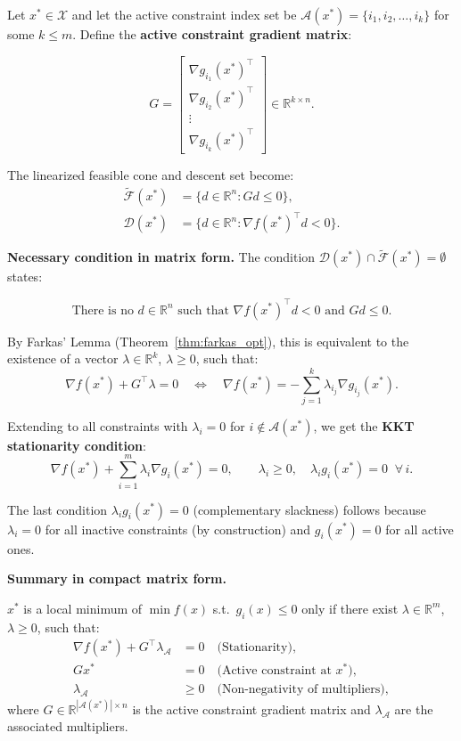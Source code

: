 \documentclass[11pt]{article}
\theoremstyle{definition}
\theoremstyle{plain}
\theoremstyle{remark}
\begin{document}
Let $x^* \in \mathcal{X}$ and let the active constraint index set be $\mathcal{A}(x^*) = \{i_1, i_2, \ldots, i_k\}$ for some $k \leq m$. Define the \textbf{active constraint gradient matrix}:

\[
  G =
  \begin{bmatrix}
    \nabla g_{i_1}(x^*)^\top \\
    \nabla g_{i_2}(x^*)^\top \\
    \vdots \\
    \nabla g_{i_k}(x^*)^\top
  \end{bmatrix} \in \mathbb{R}^{k \times n}.
\]

The linearized feasible cone and descent set become:
\begin{align*}
  \widetilde{\mathcal{F}}(x^*) &= \{d \in \mathbb{R}^n : Gd \leq 0\}, \\
  \mathcal{D}(x^*)             &= \{d \in \mathbb{R}^n : \nabla f(x^*)^\top d < 0\}.
\end{align*}

\textbf{Necessary condition in matrix form.} The condition $\mathcal{D}(x^*) \cap \widetilde{\mathcal{F}}(x^*) = \emptyset$ states:

\[
  \boxed{\text{There is no } d \in \mathbb{R}^n \text{ such that } \nabla f(x^*)^\top d < 0 \text{ and } Gd \leq 0.}
\]

By Farkas' Lemma (Theorem~\ref{thm:farkas_opt}), this is equivalent to the existence of a vector $\lambda \in \mathbb{R}^k$, $\lambda \geq 0$, such that:
\[
  \nabla f(x^*) + G^\top \lambda = 0 \quad \Longleftrightarrow \quad \nabla f(x^*) = -\sum_{j=1}^{k} \lambda_{i_j} \nabla g_{i_j}(x^*).
\]

Extending to all constraints with $\lambda_i = 0$ for $i \notin \mathcal{A}(x^*)$, we get the \textbf{KKT stationarity condition}:
\[
  \nabla f(x^*) + \sum_{i=1}^{m} \lambda_i \nabla g_i(x^*) = 0, \qquad \lambda_i \geq 0, \quad \lambda_i g_i(x^*) = 0 \;\; \forall\, i.
\]

The last condition $\lambda_i g_i(x^*) = 0$ (complementary slackness) follows because $\lambda_i = 0$ for all inactive constraints (by construction) and $g_i(x^*) = 0$ for all active ones.

\textbf{Summary in compact matrix form.}

\begin{tcolorbox}[colback=blue!5, colframe=blue!60!black, title=Local Minimum Characterization (Matrix Form)]
$x^*$ is a local minimum of $\min f(x)$ s.t.\ $g_i(x) \leq 0$ only if there exist $\lambda \in \mathbb{R}^m$, $\lambda \geq 0$, such that:
\begin{align*}
  \nabla f(x^*) + G^\top \lambda_{\mathcal{A}} &= 0 \quad \text{(Stationarity)}, \\
  G x^* &= 0 \quad \text{(Active constraint at } x^*\text{)}, \\
  \lambda_{\mathcal{A}} &\geq 0 \quad \text{(Non-negativity of multipliers)},
\end{align*}
where $G \in \mathbb{R}^{|\mathcal{A}(x^*)| \times n}$ is the active constraint gradient matrix and $\lambda_{\mathcal{A}}$ are the associated multipliers.
\end{tcolorbox}
\end{document}
